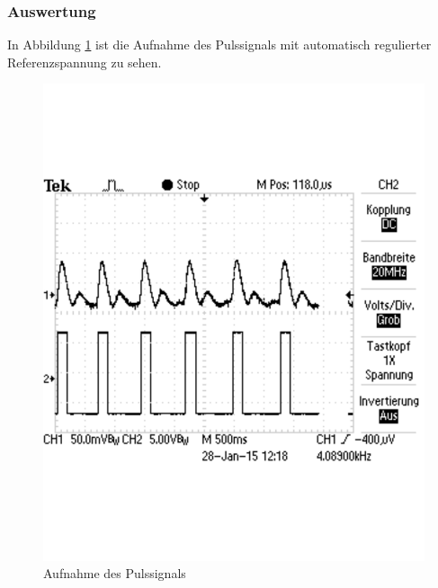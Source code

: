 \documentclass[12pt,a4paper]{article}
\begin{document}
\subsubsection*{Auswertung}

In Abbildung \ref{fig:5_2} ist die Aufnahme des Pulssignals mit automatisch regulierter Referenzspannung zu sehen.

\begin{figure}[H] 
	\centering
	\includegraphics[trim = 0mm 50mm 0mm 50mm, clip, scale = 0.4]{5_2.pdf}
	\caption[Aufnahme des Pulssignals]{Aufnahme des Pulssignals}
	\label{fig:5_2}
\end{figure}
\end{document}
